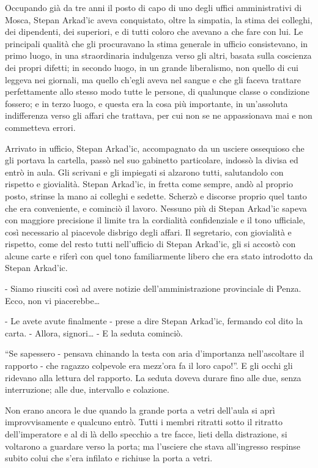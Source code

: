 Occupando già da tre anni il posto di capo di uno degli uffici amministrativi di Mosca, Stepan Arkad'ic aveva conquistato, oltre la simpatia, la stima dei colleghi, dei dipendenti, dei superiori, e di tutti coloro che avevano a che fare con lui. Le principali qualità che gli procuravano la stima generale in ufficio consistevano, in primo luogo, in una straordinaria indulgenza verso gli altri, basata sulla coscienza dei propri difetti; in secondo luogo, in un grande liberalismo, non quello di cui leggeva nei giornali, ma quello ch'egli aveva nel sangue e che gli faceva trattare perfettamente allo stesso modo tutte le persone, di qualunque classe o condizione fossero; e in terzo luogo, e questa era la cosa più importante, in un'assoluta indifferenza verso gli affari che trattava, per cui non se ne appassionava mai e non commetteva errori. 

Arrivato in ufficio, Stepan Arkad'ic, accompagnato da un usciere ossequioso che gli portava la cartella, passò nel suo gabinetto particolare, indossò la divisa ed entrò in aula. Gli scrivani e gli impiegati si alzarono tutti, salutandolo con rispetto e giovialità. Stepan Arkad'ic, in fretta come sempre, andò al proprio posto, strinse la mano ai colleghi e sedette. Scherzò e discorse proprio quel tanto che era conveniente, e cominciò il lavoro. Nessuno più di Stepan Arkad'ic sapeva con maggiore precisione il limite tra la cordialità confidenziale e il tono ufficiale, così necessario al piacevole disbrigo degli affari. Il segretario, con giovialità e rispetto, come del resto tutti nell'ufficio di Stepan Arkad'ic, gli si accostò con alcune carte e riferì con quel tono familiarmente libero che era stato introdotto da Stepan Arkad'ic. 

- Siamo riusciti così ad avere notizie dell'amministrazione provinciale di Penza. Ecco, non vi piacerebbe\ldots{} 

- Le avete avute finalmente - prese a dire Stepan Arkad'ic, fermando col dito la carta. - Allora, signori\ldots{} - E la seduta cominciò. 

``Se sapessero - pensava chinando la testa con aria d'importanza nell'ascoltare il rapporto - che ragazzo colpevole era mezz'ora fa il loro capo!''. E gli occhi gli ridevano alla lettura del rapporto. La seduta doveva durare fino alle due, senza interruzione; alle due, intervallo e colazione. 

Non erano ancora le due quando la grande porta a vetri dell'aula si aprì improvvisamente e qualcuno entrò. Tutti i membri ritratti sotto il ritratto dell'imperatore e al di là dello specchio a tre facce, lieti della distrazione, si voltarono a guardare verso la porta; ma l'usciere che stava all'ingresso respinse subito colui che s'era infilato e richiuse la porta a vetri. 

